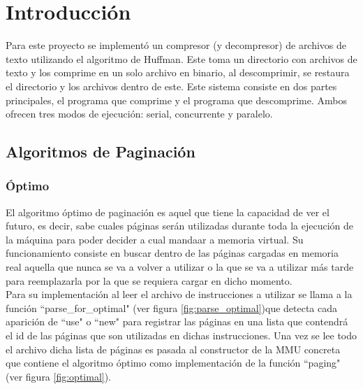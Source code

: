 \documentclass{report}
\begin{document}


\tableofcontents

\chapter{Introducción}\label{intro}

Para este proyecto se implementó un compresor (y decompresor) de archivos de texto utilizando el algoritmo de Huffman.
Este toma un directorio con archivos de texto y los comprime en un solo archivo en binario, al descomprimir, se restaura el directorio y los archivos dentro de este.
Este sistema consiste en dos partes principales,  el programa que comprime y el programa que descomprime.
Ambos ofrecen tres modos de ejecución: serial, concurrente y paralelo.

\section {Algoritmos de Paginación}
\subsection{Óptimo}
El algoritmo óptimo de paginación es aquel que tiene la capacidad de ver el futuro, es decir, sabe cuales páginas serán utilizadas durante toda la ejecución de la máquina para poder decider a cual mandaar a memoria virtual. Su funcionamiento consiste en buscar dentro de las páginas cargadas en memoria real aquella que nunca se va a volver a utilizar o la que se va a utilizar más tarde para reemplazarla por la que se requiera cargar en dicho momento. \\


Para su implementación al leer el archivo de instrucciones a utilizar se llama a la función ``parse\_for\_optimal" (ver figura \ref{fig:parse_optimal})que detecta cada aparición de ``use" o ``new" para registrar las páginas en una lista que contendrá el id de las páginas que son utilizadas en dichas instrucciones. Una vez se lee todo el archivo dicha lista de páginas es pasada al constructor de la MMU concreta que contiene el algoritmo óptimo como implementación de la función ``paging" (ver figura \ref{fig:optimal}).
\end{document}
